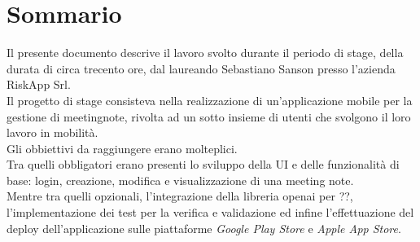 \cleardoublepage
{}
{}
\begingroup
\let\clearpage\relax
\let\cleardoublepage\relax
\let\cleardoublepage\relax

\chapter*{Sommario}

Il presente documento descrive il lavoro svolto durante il periodo di stage, della durata di circa trecento ore, dal laureando Sebastiano Sanson presso l'azienda RiskApp Srl. \\

Il progetto di stage consisteva nella realizzazione di un'applicazione mobile per la gestione di \gls{meetingnote}, rivolta ad un sotto insieme di utenti che svolgono il loro lavoro in mobilità. \\

Gli obbiettivi da raggiungere erano molteplici.\\
Tra quelli obbligatori erano presenti lo sviluppo della UI e delle funzionalità di base: login, creazione, modifica e visualizzazione di una meeting note.\\
Mentre tra quelli opzionali, l'integrazione della libreria \gls{openai} per ??, l'implementazione dei test per la verifica e validazione ed infine l'effettuazione del deploy dell'applicazione sulle piattaforme \emph{Google Play Store} e \emph{Apple App Store}.\\




\endgroup

\vfill
